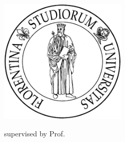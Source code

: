 \begin{titlepage}
	\begin{addmargin}[-1cm]{-3cm}
    \begin{center}
        \large  

        \hfill

        \vfill

        \begingroup
            \color{Maroon}\spacedallcaps{\myTitle} \\ \medskip
            \mySubtitle \\ \bigskip   
        \endgroup

        \spacedlowsmallcaps{\myName}

        \vfill

        \includegraphics[width=6cm]{gfx/logo/unifi} \\ \medskip

        \vfill
        supervised by Prof. \emph{\myProf}\\ \medskip
        \myFaculty \\
        \myUni \\ \bigskip

        \myTime

        \vfill                      

    \end{center}  
  \end{addmargin}       
\end{titlepage}   
